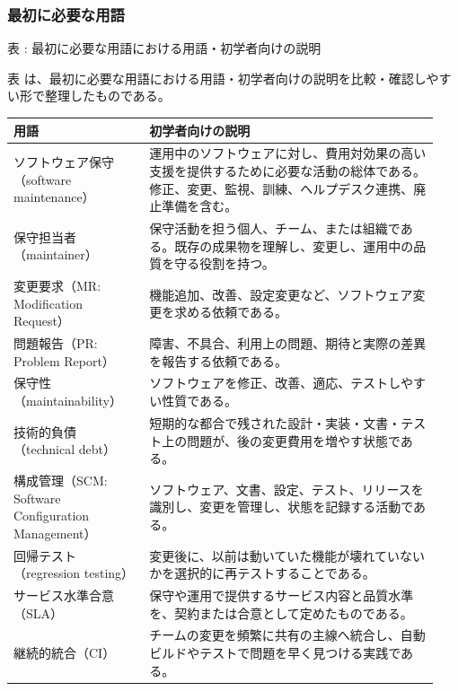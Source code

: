 \subsubsection{最初に必要な用語}
\par\smallskip\noindent{}\label{tab:ch07-01}表 \thetable: 最初に必要な用語における用語・初学者向けの説明\par\smallskip
表 \thetable は、最初に必要な用語における用語・初学者向けの説明を比較・確認しやすい形で整理したものである。\par\smallskip
\begin{longtable}{p{0.30\linewidth}p{0.64\linewidth}}
\toprule
用語 & 初学者向けの説明 \\
\midrule
\endhead
ソフトウェア保守（software maintenance） & 運用中のソフトウェアに対し、費用対効果の高い支援を提供するために必要な活動の総体である。修正、変更、監視、訓練、ヘルプデスク連携、廃止準備を含む。 \\
保守担当者（maintainer） & 保守活動を担う個人、チーム、または組織である。既存の成果物を理解し、変更し、運用中の品質を守る役割を持つ。 \\
変更要求（MR: Modification Request） & 機能追加、改善、設定変更など、ソフトウェア変更を求める依頼である。 \\
問題報告（PR: Problem Report） & 障害、不具合、利用上の問題、期待と実際の差異を報告する依頼である。 \\
保守性（maintainability） & ソフトウェアを修正、改善、適応、テストしやすい性質である。 \\
技術的負債（technical debt） & 短期的な都合で残された設計・実装・文書・テスト上の問題が、後の変更費用を増やす状態である。 \\
構成管理（SCM: Software Configuration Management） & ソフトウェア、文書、設定、テスト、リリースを識別し、変更を管理し、状態を記録する活動である。 \\
回帰テスト（regression testing） & 変更後に、以前は動いていた機能が壊れていないかを選択的に再テストすることである。 \\
サービス水準合意（SLA） & 保守や運用で提供するサービス内容と品質水準を、契約または合意として定めたものである。 \\
継続的統合（CI） & チームの変更を頻繁に共有の主線へ統合し、自動ビルドやテストで問題を早く見つける実践である。 \\
\bottomrule
\end{longtable}
